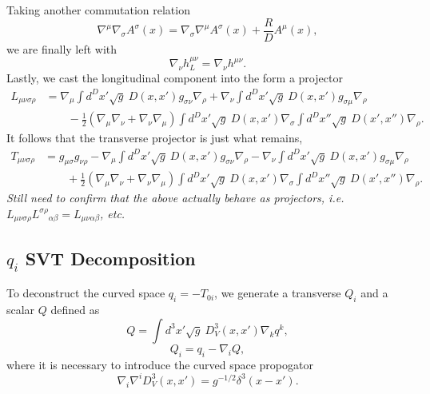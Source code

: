 \documentclass[10pt,letterpaper]{article}
\begin{document}
Taking another commutation relation
\begin{equation}
\nabla^\mu \nabla_\sigma A^\sigma(x) = \nabla_\sigma\nabla^\mu A^\sigma(x) + \frac{R}{D}A^\mu(x),
\end{equation}
we are finally left with
\begin{equation}
\nabla_\nu h^{\mu\nu}_L = \nabla_\nu h^{\mu\nu}.
\end{equation}
Lastly, we cast the longitudinal component into the form a projector
\begin{align}
L_{\mu\nu\sigma\rho} &= \nabla_\mu \int d^Dx' \sqrt g\ D(x,x') g_{\sigma\nu}\nabla_\rho 
+ \nabla_\nu \int d^Dx' \sqrt g\ D(x,x') g_{\sigma\mu}\nabla_\rho 
\nonumber\\
&\qquad - \frac12(\nabla_\mu\nabla_\nu+\nabla_\nu\nabla_\mu) \int d^Dx'\sqrt{g}\  D(x,x') \nabla_\sigma \int d^Dx'' \sqrt{g}\ D(x',x'')\nabla_\rho. 
\end{align}
It follows that the transverse projector is just what remains,
\begin{align}
T_{\mu\nu\sigma\rho} &= g_{\mu\sigma}g_{\nu\rho}- \nabla_\mu \int d^Dx' \sqrt g\ D(x,x') g_{\sigma\nu}\nabla_\rho 
- \nabla_\nu \int d^Dx' \sqrt g\ D(x,x') g_{\sigma\mu}\nabla_\rho 
\nonumber\\
&\qquad + \frac12(\nabla_\mu\nabla_\nu+\nabla_\nu\nabla_\mu) \int d^Dx'\sqrt{g}\  D(x,x') \nabla_\sigma \int d^Dx'' \sqrt{g}\ D(x',x'')\nabla_\rho. 
\end{align}
\emph{Still need to confirm that the above actually behave as projectors, i.e. $L_{\mu\nu\sigma\rho}L^{\sigma\rho}{}_{\alpha\beta} = L_{\mu\nu\alpha\beta}$, etc.}
\subsection{$q_i$ SVT Decomposition}
To deconstruct the curved space $q_i = -T_{0i}$, we generate a transverse $Q_i$ and a scalar $Q$ defined as
\begin{equation}
Q =  \int d^3x' \sqrt{g}\ D^3_V(x,x')\nabla_k q^k,
\end{equation}
\begin{equation}
Q_i = q_i - \nabla_i Q,
\end{equation}
where it is necessary to introduce the curved space propogator
\begin{equation}
\nabla_i \nabla^i D^3_V(x,x') = g^{-1/2}\delta^3(x-x').
\end{equation}
\end{document}
